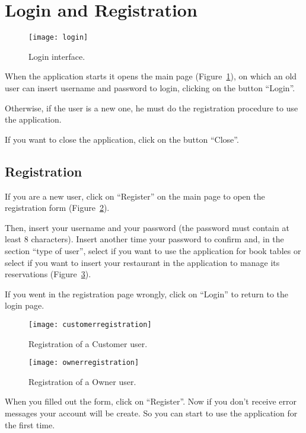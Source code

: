 \section{Login and Registration}

\begin{figure}[hb]
	\texttt{[image: login]}
	\caption{Login interface.}
	\label{fig:login}
\end{figure}

When the application starts it opens the main page (Figure~\ref{fig:login}), on
which an old user can insert username and password to login, clicking on the
button ``Login''.

Otherwise, if the user is a new one, he must do the registration procedure to
use the application.

If you want to close the application, click on the button ``Close''.

\subsection{Registration}

If you are a new user, click on ``Register'' on the main page to open the
registration form (Figure~\ref{fig:customerregistration}).

Then, insert your username and your password (the password must contain at least
8 characters). Insert another time your password to confirm and, in the section
``type of user'', select  if you want to use the application for
book tables or select  if you want to insert your restaurant in the
application to manage its reservations (Figure~\ref{fig:ownerregistration}).

If you went in the registration page wrongly, click on ``Login'' to return to
the login page.

\begin{figure}[ht]
	\texttt{[image: customerregistration]}
	\caption{Registration of a Customer user.}
	\label{fig:customerregistration}
\end{figure}

\begin{figure}[ht]
	\texttt{[image: ownerregistration]}
	\caption{Registration of a Owner user.}
	\label{fig:ownerregistration}
\end{figure}

When you filled out the form, click on ``Register''. Now if you don’t receive
error messages your account will be create. So you can start to use the
application for the first time.
